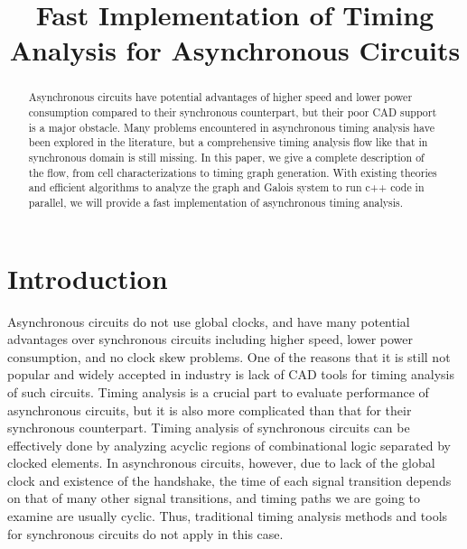 \documentclass[sigconf, 10pt, twocolumn]{acmart}
\begin{document}
\title{Fast Implementation of Timing Analysis for Asynchronous Circuits}

\begin{abstract}
Asynchronous circuits have potential advantages of higher speed and lower power consumption compared to their synchronous counterpart, but their poor CAD support is a major obstacle. Many problems encountered in asynchronous timing analysis have been explored in the literature, but a comprehensive timing analysis flow like that in synchronous domain is still missing. In this paper, we give a complete description of the flow, from cell characterizations to timing graph generation. With existing theories and efficient algorithms to analyze the graph and Galois system to run c++ code in parallel, we will provide a fast implementation of asynchronous timing analysis.
\end{abstract}
\maketitle
\section{Introduction}
Asynchronous circuits do not use global clocks, and have many potential advantages over synchronous circuits including higher speed, lower power consumption, and no clock skew problems. One of the reasons that it is still not popular and widely accepted in industry is lack of CAD tools for timing analysis of such circuits. Timing analysis is a crucial part to evaluate performance of asynchronous circuits, but it is also more complicated than that for their synchronous counterpart. Timing analysis of synchronous circuits can be effectively done by analyzing acyclic regions of combinational logic separated by clocked elements. In asynchronous circuits, however, due to lack of the global clock and existence of the handshake, the time of each signal transition depends on that of many other signal transitions, and timing paths we are going to examine are usually cyclic. Thus, traditional timing analysis methods and tools for synchronous circuits do not apply in this case.
\end{document}
